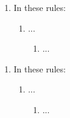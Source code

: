 \begin{enumerate}
    \item In these rules:
    \begin{enumerate}
        \item ...
        \begin{enumerate}
            \item ...
        \end{enumerate}
    \end{enumerate}    
\end{enumerate}

\begin{enumerate}
    \item In these rules:
    \begin{enumerate}
        \item ...
        \begin{enumerate}
            \item ...
        \end{enumerate}
    \end{enumerate}    
\end{enumerate}
